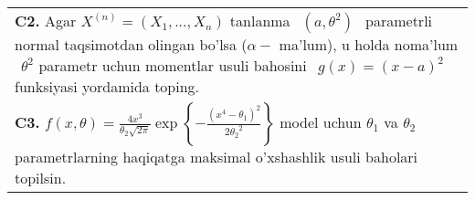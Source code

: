 \documentclass{article}
\begin{document}
\begin{tabular}{m{17cm}}
\\
\textbf{C2.} 
Agar \(X^{(n)} = \left( X_{1},...,X_{n} \right)\) tanlanma \(\ \ (a,\theta^{2})\ \ \) parametrli normal taqsimotdan olingan bo'lsa (\(\alpha -\) ma'lum), u holda noma'lum \(\ \ \theta^{2}\) parametr uchun momentlar usuli bahosini \(\ \ g(x) = (x - a)^{2}\) funksiyasi yordamida toping.
\\
\textbf{C3.} 
\(f(x,\theta) = \frac{4x^{3}}{\theta_{2}\sqrt{2\pi}}\exp\left\{ - \frac{\left( x^{4} - \theta_{1} \right)^{2}}{2{\theta_{2}}^{2}} \right\}\) model uchun \(\theta_{1}\) va \(\theta_{2}\) parametrlarning haqiqatga maksimal o'xshashlik usuli baholari topilsin.
\\

\end{tabular}
\vspace{1cm}
\end{document}
